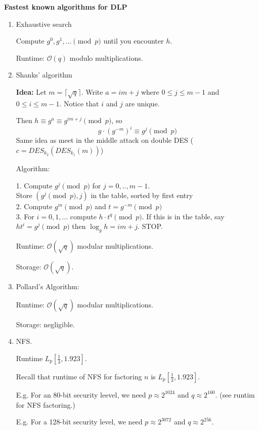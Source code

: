 \documentclass[a4paper,12pt]{article}
\begin{document}
{\bf Fastest known algorithms for DLP}
\begin{enumerate}
 \item Exhaustive search
 
 Compute $g^0,g^1,\ldots \pmod p$ until you encounter $h$.
 
 Runtime: $\mathcal O (q)$ modulo multiplications.
 
 \item Shanks' algorithm
 
 {\bf Idea:} Let $m=\lceil \sqrt q \rceil$.  Write $a=im+j$ where
 $0\le j \le m-1$ and $0\le i \le m-1$.  Notice that $i$ and $j$ are unique.
 
 Then $h\equiv g^a \equiv g^{im+j} \pmod p$, so
 $$
 g\cdot (g^{-m})^i \equiv g^j \pmod p
 $$
 Same idea as meet in the middle attack on double DES ($c = DES_{k_2}(DES_{k_1}(m))$)
 
 Algorithm:
 
 1. Compute $g^j \pmod p$ for $j=0,..,m-1$.\\
    Store $(g^j \pmod p, j)$ in the table, sorted by first entry\\
 2. Compute $g^m \pmod p$ and $t=g^{-m} \pmod p$\\
 3. For $i=0,1,\ldots$ compute $h\cdot t^q \pmod p$.  
    If this is in the table, say $ht^i=g^j \pmod p$ then
    $\log_gh=im+j$.  STOP.
 
 Runtime: $\mathcal O (\sqrt{q})$ modular multiplications.
 
 Storage: $\mathcal O (\sqrt q)$.
 
 \item
 Pollard's Algorithm:
 
 Runtime: $\mathcal O (\sqrt q)$ modular multiplications.
 
 Storage: negligible.
 
\item
 NFS.
 
 Runtime $L_p [\frac{1}{3},1.923]$.  
 
 Recall that runtime of NFS for factoring $n$ is $L_p [\frac{1}{3},1.923]$.

\end{enumerate}
\begin{itemize}
 \item[E.g.]
For an 80-bit security leevel, we need $p\approx2^{1024}$ 
and $q\approx 2^{160}$.
(see runtim for NFS factoring.)
\item[E.g.]
For a 128-bit security level, we need $p\approx 2^{3072}$ and $q\approx 2^{256}$.
\end{itemize}
\end{document}
